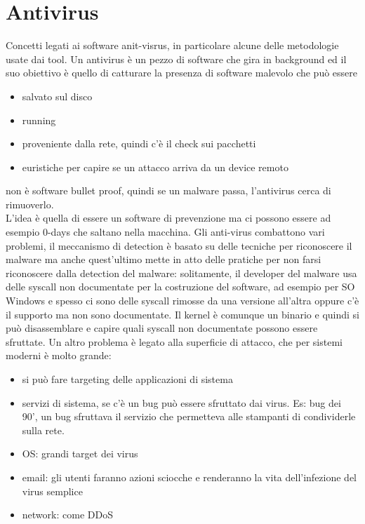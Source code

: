 \documentclass[12pt, oneside]{extbook} %
\begin{document}
\chapter{Antivirus}
Concetti legati ai software anit-visrus, in particolare alcune delle metodologie usate dai tool. Un antivirus è un pezzo di software che gira in background ed il suo obiettivo è quello di catturare la presenza di software malevolo che può essere
\begin{itemize}
\item salvato sul disco
\item running
\item proveniente dalla rete, quindi c'è il check sui pacchetti
\item euristiche per capire se un attacco arriva da un device remoto
\end{itemize}
non è software bullet proof, quindi se un malware passa, l'antivirus cerca di rimuoverlo.\\L'idea è quella di essere un software di prevenzione ma ci possono essere ad esempio 0-days che saltano nella macchina. Gli anti-virus combattono vari problemi, il meccanismo di detection è basato su delle tecniche per riconoscere il malware ma anche quest'ultimo mette in atto delle pratiche per non farsi riconoscere dalla detection del malware: solitamente, il developer del malware usa delle syscall non documentate per la costruzione del software, ad esempio per SO Windows e spesso ci sono delle syscall rimosse da una versione all'altra oppure c'è il supporto ma non sono documentate. Il kernel è comunque un binario e quindi si può disassemblare e capire quali syscall non documentate possono essere sfruttate. Un altro problema è legato alla superficie di attacco, che per sistemi moderni è molto grande:
\begin{itemize}
\item si può fare targeting delle applicazioni di sistema
\item servizi di sistema, se c'è un bug può essere sfruttato dai virus. Es: bug dei 90', un bug sfruttava il servizio che permetteva alle stampanti di condividerle sulla rete.
\item OS: grandi target dei virus
\item email: gli utenti faranno azioni sciocche e renderanno la vita dell'infezione del virus semplice
\item network: come DDoS
\end{itemize}
\end{document}

